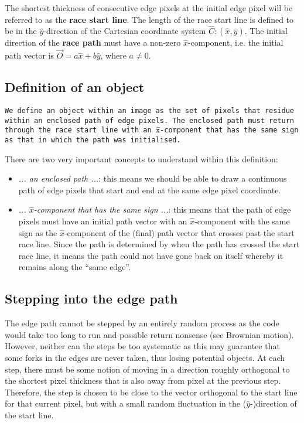 \documentclass[11pt]{article}
\begin{document}
The shortest thickness of consecutive edge pixels at the initial edge pixel will be referred to as the \textbf{race start line}. The length of the race start line is defined to be in the $\hat{y}$-direction of the Cartesian coordinate system $\hat{C}: (\hat{x},\hat{y})$. The initial direction of the \textbf{race path} must have a non-zero $\hat{x}$-component, i.e. the initial path vector is $\vec{O}=a\hat{x}+b\hat{y}$, where $a \neq 0$.

\subsection{Definition of an object}
\begin{center}
\texttt{We define an object within an image as the set of pixels that residue\\ within an enclosed path of edge pixels. The enclosed path must return\\ through the race start line with an $\hat{\texttt{x}}$-component that has the same sign\\ as that in
	 which the path was initialised.}
\end{center}
There are two very important concepts to understand within this definition:
\begin{itemize}
  \item \textit{... an enclosed path ...}: this means we should be able to draw a continuous path of edge pixels that start and end at the same edge pixel coordinate.
  \item \textit{... $\hat{x}$-component that has the same sign ...}: this means that the path of edge pixels must have an initial path vector with an $\hat{x}$-component with the same sign as the $\hat{x}$-component of the (final) path vector that crosses past the start race line. Since the path is determined by when the path has crossed the start race line, it means the path could not have gone back on itself whereby it remains along the ``same edge''. %
\end{itemize}

\subsection{Stepping into the edge path}
The edge path cannot be stepped by an entirely random process as the code would take too long to run and possible return nonsense (see Brownian motion). However, neither can the steps be too systematic as this may guarantee that some forks in the edges are never taken, thus losing potential objects. At each step, there must be some notion of moving in a direction roughly orthogonal to the shortest pixel thickness that is also away from pixel at the previous step. Therefore, the step is chosen to be close to the vector orthogonal to the start line for that current pixel, but with a small random fluctuation in the ($\hat{y}$-)direction of the start line.
\end{document}
